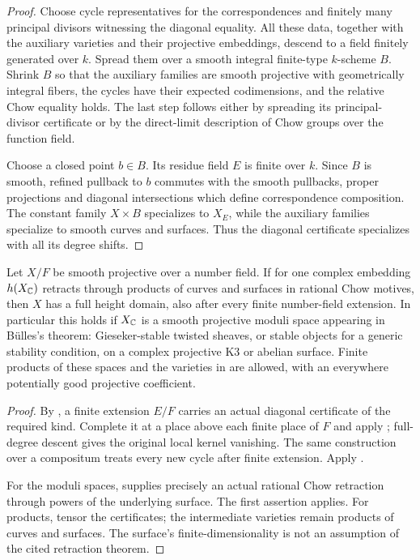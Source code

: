 \begin{proof}
Choose cycle representatives for the correspondences and finitely
many principal divisors witnessing the diagonal equality. All these
data, together with the auxiliary varieties and their projective
embeddings, descend to a field finitely generated over $k$. Spread
them over a smooth integral finite-type $k$-scheme $B$. Shrink $B$
so that the auxiliary families are smooth projective with
geometrically integral fibers, the cycles have their expected
codimensions, and the relative Chow equality holds. The last step
follows either by spreading its principal-divisor certificate or by
the direct-limit description of Chow groups over the function field.

Choose a closed point $b\in B$. Its residue field $E$ is finite over
$k$. Since $B$ is smooth, refined pullback to $b$ commutes with
the smooth pullbacks, proper projections and diagonal intersections
which define correspondence composition. The constant family
$X\times B$ specializes to $X_E$, while the auxiliary families
specialize to smooth curves and surfaces. Thus the diagonal
certificate specializes with all its degree shifts.
\end{proof}

\begin{theorem}\label{thm:moduli}
Let $X/F$ be smooth projective over a number field. If for one complex
embedding $h(X_\mathbb C)$ retracts through products of curves and surfaces
in rational Chow motives, then $X$ has a full height domain, also
after every finite number-field extension. In particular this holds
if $X_\mathbb C$ is a smooth projective moduli space appearing in
B\"ulles's theorem: Gieseker-stable twisted sheaves, or stable objects
for a generic stability condition, on a complex projective K3 or
abelian surface. Finite products of these spaces and the varieties
in  are allowed, with an everywhere potentially
good projective coefficient.
\end{theorem}

\begin{proof}
By , a finite extension $E/F$
carries an actual diagonal certificate of the required kind.
Complete it at a place above each finite place of $F$ and apply
; full-degree descent gives the
original local kernel vanishing. The same construction over a
compositum treats every new cycle after finite extension. Apply
.

For the moduli spaces, \cite[Theorem 0.1]{Bulles} supplies precisely
an actual rational Chow retraction through powers of the underlying
surface. The first assertion applies. For products, tensor the
certificates; the intermediate varieties remain products of curves
and surfaces. The surface's finite-dimensionality is not an
assumption of the cited retraction theorem.
\end{proof}
